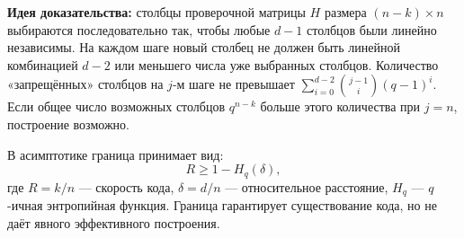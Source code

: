 \documentclass{article}
\begin{document}
\textbf{Идея доказательства:} столбцы проверочной матрицы \( H \) размера \( (n-k) \times n \) выбираются последовательно так, чтобы любые \( d-1 \) столбцов были линейно независимы. На каждом шаге новый столбец не должен быть линейной комбинацией \( d-2 \) или меньшего числа уже выбранных столбцов. Количество «запрещённых» столбцов на \( j \)-м шаге не превышает \( \sum_{i=0}^{d-2} \binom{j-1}{i} (q-1)^i \). Если общее число возможных столбцов \( q^{n-k} \) больше этого количества при \( j = n \), построение возможно.

В асимптотике граница принимает вид:
\[
R \ge 1 - H_q(\delta),
\]
где \( R = k/n \) — скорость кода, \( \delta = d/n \) — относительное расстояние, \( H_q \) — \( q \)-ичная энтропийная функция. Граница гарантирует существование кода, но не даёт явного эффективного построения.
\end{document}
